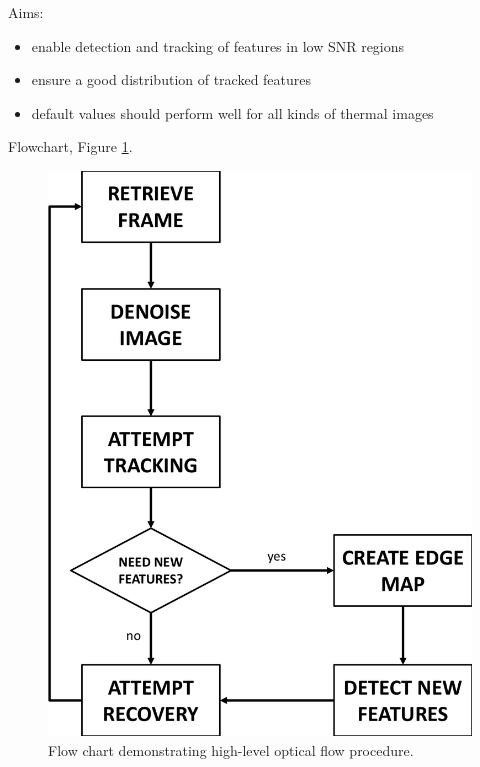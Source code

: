 Aims:

\begin{itemize}
	\item enable detection and tracking of features in low SNR regions
	\item ensure a good distribution of tracked features
	\item default values should perform well for all kinds of thermal images
\end{itemize}

Flowchart, Figure \ref{fig:optical_flow_flowchart}.

\begin{figure}
\centering
\includegraphics[width=1.0\columnwidth]{media/optical_flow_flowchart.pdf}
\caption{Flow chart demonstrating high-level optical flow procedure.}
\label{fig:optical_flow_flowchart}
\end{figure}

